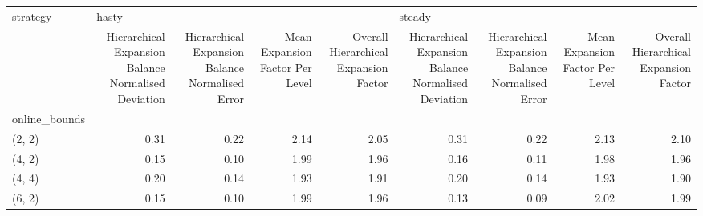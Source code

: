 \begin{tabular}{lrrrrrrrr}
\toprule
strategy & \multicolumn{4}{l}{hasty} & \multicolumn{4}{l}{steady} \\
{} & Hierarchical Expansion Balance Normalised Deviation & Hierarchical Expansion Balance Normalised Error & Mean Expansion Factor Per Level & Overall Hierarchical Expansion Factor & Hierarchical Expansion Balance Normalised Deviation & Hierarchical Expansion Balance Normalised Error & Mean Expansion Factor Per Level & Overall Hierarchical Expansion Factor \\
online\_bounds &                                                     &                                                 &                                 &                                       &                                                     &                                                 &                                 &                                       \\
\midrule
(2, 2)        &                                               0.31 &                                            0.22 &                            2.14 &                                  2.05 &                                               0.31 &                                            0.22 &                            2.13 &                                  2.10 \\
(4, 2)        &                                               0.15 &                                            0.10 &                            1.99 &                                  1.96 &                                               0.16 &                                            0.11 &                            1.98 &                                  1.96 \\
(4, 4)        &                                               0.20 &                                            0.14 &                            1.93 &                                  1.91 &                                               0.20 &                                            0.14 &                            1.93 &                                  1.90 \\
(6, 2)        &                                               0.15 &                                            0.10 &                            1.99 &                                  1.96 &                                               0.13 &                                            0.09 &                            2.02 &                                  1.99 \\

\end{tabular}
